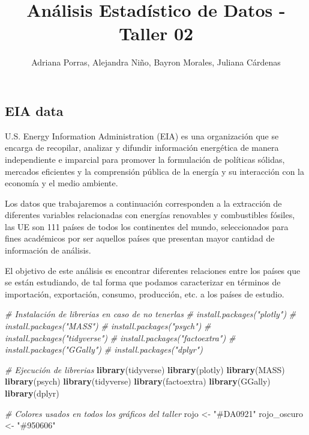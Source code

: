 \documentclass[
]{article}
\title{Análisis Estadístico de Datos - Taller 02}
\author{Adriana Porras, Alejandra Niño, Bayron Morales, Juliana
Cárdenas}
\date{}
\newenvironment{Shaded}{\begin{snugshade}}{\end{snugshade}}
\newcommand{\CommentTok}[1]{\textcolor[rgb]{0.56,0.35,0.01}{\textit{#1}}}
\newcommand{\FunctionTok}[1]{\textcolor[rgb]{0.13,0.29,0.53}{\textbf{#1}}}
\newcommand{\NormalTok}[1]{#1}
\newcommand{\OtherTok}[1]{\textcolor[rgb]{0.56,0.35,0.01}{#1}}
\newcommand{\StringTok}[1]{\textcolor[rgb]{0.31,0.60,0.02}{#1}}
\begin{document}
\maketitle

\subsection{EIA data}\label{eia-data}

U.S. Energy Information Administration (EIA) es una organización que se
encarga de recopilar, analizar y difundir información energética de
manera independiente e imparcial para promover la formulación de
políticas sólidas, mercados eficientes y la comprensión pública de la
energía y su interacción con la economía y el medio ambiente.

Los datos que trabajaremos a continuación corresponden a la extracción
de diferentes variables relacionadas con energías renovables y
combustibles fósiles, las UE son 111 países de todos los continentes del
mundo, seleccionados para fines académicos por ser aquellos países que
presentan mayor cantidad de información de análisis.

El objetivo de este análisis es encontrar diferentes relaciones entre
los países que se están estudiando, de tal forma que podamos
caracterizar en términos de importación, exportación, consumo,
producción, etc. a los países de estudio.

\begin{Shaded}
\begin{Highlighting}[]
\CommentTok{\# Instalación de librerias en caso de no tenerlas}
\CommentTok{\# install.packages("plotly")}
\CommentTok{\# install.packages("MASS")}
\CommentTok{\# install.packages("psych")}
\CommentTok{\# install.packages("tidyverse")}
\CommentTok{\# install.packages("factoextra")}
\CommentTok{\# install.packages("GGally")}
\CommentTok{\# install.packages("dplyr")}

\CommentTok{\# Ejecución de librerias}
\FunctionTok{library}\NormalTok{(tidyverse)}
\FunctionTok{library}\NormalTok{(plotly)}
\FunctionTok{library}\NormalTok{(MASS)}
\FunctionTok{library}\NormalTok{(psych)}
\FunctionTok{library}\NormalTok{(tidyverse)}
\FunctionTok{library}\NormalTok{(factoextra)}
\FunctionTok{library}\NormalTok{(GGally)}
\FunctionTok{library}\NormalTok{(dplyr)}
\end{Highlighting}
\end{Shaded}

\begin{Shaded}
\begin{Highlighting}[]
\CommentTok{\# Colores usados en todos los gráficos del taller}
\NormalTok{rojo        }\OtherTok{\textless{}{-}} \StringTok{"\#DA0921"}
\NormalTok{rojo\_oscuro }\OtherTok{\textless{}{-}} \StringTok{"\#950606"}
\end{Highlighting}
\end{Shaded}
\end{document}
